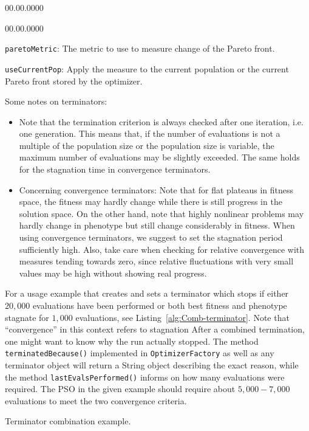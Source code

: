 \begin{lyxlist}{00.00.0000}
\begin{lyxlist}{00.00.0000}
\item [{\texttt{paretoMetric}:}] The metric to use to measure change of
the Pareto front.
\item [{\texttt{useCurrentPop}:}] Apply the measure to the current population
or the current Pareto front stored by the optimizer.
\end{lyxlist}
\end{lyxlist}
Some notes on terminators: 
\begin{itemize}
\item Note that the termination criterion is always checked after one iteration,
i.e. one generation. This means that, if the number of evaluations
is not a multiple of the population size or the population size is
variable, the maximum number of evaluations may be slightly exceeded.
The same holds for the stagnation time in convergence terminators.
\item Concerning convergence terminators: Note that for flat plateaus in
fitness space, the fitness may hardly change while there is still
progress in the solution space. On the other hand, note that highly
nonlinear problems may hardly change in phenotype but still change
considerably in fitness. When using convergence terminators, we suggest
to set the stagnation period sufficiently high. Also, take care when
checking for relative convergence with measures tending towards zero,
since relative fluctuations with very small values may be high without
showing real progress.
\end{itemize}
For a usage example that creates and sets a terminator which stops
if either $20,000$ evaluations have been performed or both best fitness
and phenotype stagnate for $1,000$ evaluations, see Listing~\ref{alg:Comb-terminator}.
Note that ``convergence'' in this context refers to stagnation After
a combined termination, one might want to know why the run actually
stopped. The method \texttt{terminatedBecause()} implemented in \texttt{OptimizerFactory}
as well as any terminator object will return a String object describing
the exact reason, while the method \texttt{lastEvalsPerformed()} informs
on how many evaluations were required. The PSO in the given example
should require about $5,000-7,000$ evaluations to meet the two convergence
criteria.

\begin{algorithm}




\caption{Terminator combination example.\label{alg:Comb-terminator}}
\end{algorithm}



